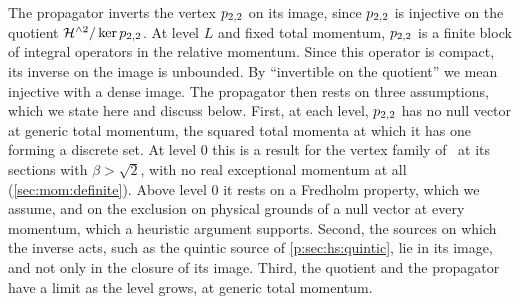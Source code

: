 The propagator inverts the vertex $p_{2,2}$ on its image, since $p_{2,2}$ is injective on the quotient $\mathcal{H}^{\wedge 2} / \ker p_{2,2}$.
At level $L$ and fixed total momentum, $p_{2,2}$ is a finite block of integral operators in the relative momentum.
Since this operator is compact, its inverse on the image is unbounded.
  By ``invertible on the quotient'' we mean injective with a dense image.
  The propagator then rests on three assumptions, which we state here and discuss below.
  First, at each level, $p_{2,2}$ has no null vector at generic total momentum, the squared total momenta at which it has one forming a discrete set.
  At level $0$ this is a result for the vertex family of~\cite{Erbin:2026:SL2CVerticesClosed} at its sections with $\beta > \sqrt{2}$, with no real exceptional momentum at all (\cref{sec:mom:definite}).
  Above level $0$ it rests on a Fredholm property, which we assume, and on the exclusion on physical grounds of a null vector at every momentum, which a heuristic argument supports.
  Second, the sources on which the inverse acts, such as the quintic source of \cref{p:sec:hs:quintic}, lie in its image, and not only in the closure of its image.
  Third, the quotient and the propagator have a limit as the level grows, at generic total momentum.

